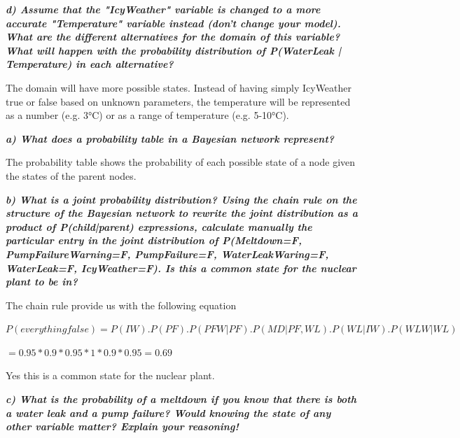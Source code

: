 \textit{\textbf{d) Assume that the "IcyWeather" variable is changed to a more
accurate
"Temperature" variable instead (don't change your model). What are the different
 alternatives for the domain of this variable? What will happen with the
 probability distribution of P(WaterLeak | Temperature) in each alternative? }}

 \vspace{1em}

The domain will have more possible states. Instead of having simply IcyWeather
true or
false based on unknown parameters, the temperature will be represented as a
number (e.g. 3°C) or as a range of temperature (e.g. 5-10°C).



\newpage
\thispagestyle{empty}

\textit{\textbf{a) What does a probability table in a Bayesian network
represent?}}

\vspace{1em}

The probability table shows the probability of each possible state of a node
given
the states of the parent nodes.


\textit{\textbf{b) What is a joint probability distribution? Using the chain
rule on the structure of the Bayesian network to rewrite the joint distribution
as a product of P(child|parent) expressions, calculate manually the particular
entry in the joint distribution of P(Meltdown=F, PumpFailureWarning=F,
PumpFailure=F, WaterLeakWaring=F, WaterLeak=F, IcyWeather=F).
Is this a common state for the nuclear plant to be in?}}

\vspace{1em}

The chain rule provide us with the following equation

$P(everything false) = P(IW).P(PF).P(PFW|PF).P(MD|PF, WL).P(WL|IW).P(WLW|WL)$

\hspace{9em}$= 0.95 * 0.9 * 0.95 * 1 * 0.9 * 0.95 = 0.69$

Yes this is a common state for the nuclear plant.

\textit{\textbf{c) What is the probability of a meltdown if you know that there
is both a water leak and a pump failure? Would knowing the state of any other
 variable matter? Explain your reasoning!}}

 \vspace{1em}

